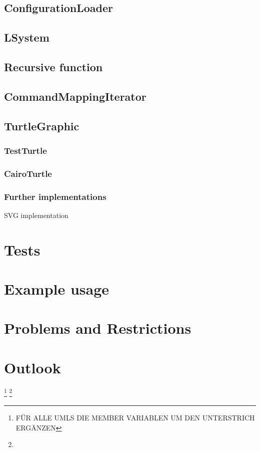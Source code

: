 \documentclass[english]{cpp-hmwk}
\begin{document}
\subsection{ConfigurationLoader}

\subsection{LSystem}

\subsection{Recursive function}

\subsection{CommandMappingIterator}

\subsection{TurtleGraphic}
\subsubsection{TestTurtle}
\subsubsection{CairoTurtle}
\subsubsection{Further implementations}
SVG implementation


\section{Tests}
\section{Example usage}
\section{Problems and Restrictions}
\section{Outlook}

\footnote{FÜR ALLE UMLS DIE MEMBER VARIABLEN UM DEN UNTERSTRICH ERGÄNZEN}
\footnote{}
\end{document}
